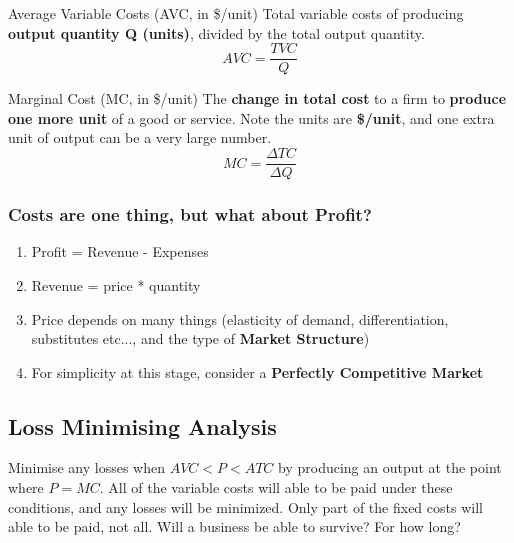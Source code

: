 \begin{note}{Average Variable Costs (AVC, in \$/unit)}
	Total variable costs of producing \textbf{output quantity Q (units)}, divided by the total output quantity. $$ AVC = \frac{TVC}{Q} $$
\end{note}
\begin{note}{Marginal Cost (MC, in \$/unit)}
	The \textbf{change in total cost} to a firm to \textbf{produce one more unit} of a good or service. Note the units are \textbf{\$/unit}, and one extra unit of output can be a very large number. $$ MC = \frac{\Delta TC}{\Delta Q} $$
\end{note}
\subsubsection{Costs are one thing, but what about Profit?}
\begin{enumerate}
	\item Profit = Revenue - Expenses
	\item Revenue = price * quantity
	\item Price depends on many things (elasticity of demand, differentiation, substitutes etc..., and the type of \textbf{Market Structure})
	\item For simplicity at this stage, consider a \textbf{Perfectly Competitive Market}
\end{enumerate}

\subsection{Loss Minimising Analysis}
Minimise any losses when $AVC < P < ATC$ by producing an output at the point where $P=MC$. All of the variable costs will able to be paid under these conditions, and any losses will be minimized. Only part of the fixed costs will able to be paid, not all. Will a business be able to survive? For how long?